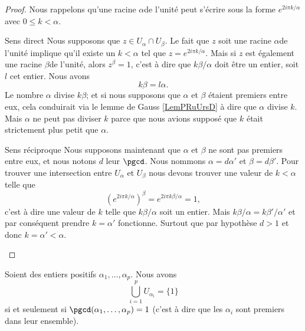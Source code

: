 \begin{proof}
    Nous rappelons qu'une racine \( \alpha\)\ieme de l'unité peut s'écrire sous la forme \(  e^{2i\pi k/\alpha}\) avec \( 0\leq k<\alpha\).
    \begin{subproof}
    \item[Sens direct]
        Nous supposons que \( z\in U_{\alpha}\cap U_{\beta}\). Le fait que \( z\) soit une racine \( \alpha\)\ieme de l'unité implique qu'il existe un \( k<\alpha\) tel que \( z= e^{2i\pi k/\alpha}\). Mais si \( z\) est également une racine \( \beta\)\ieme de l'unité, alors \( z^{\beta}=1\), c'est à dire que \( k\beta/\alpha\) doit être un entier, soit \( l\) cet entier. Nous avons
        \begin{equation}
            k\beta=l\alpha.
        \end{equation}
        Le nombre \( \alpha\) divise \( k\beta\); et si nous supposons que \( \alpha\) et \( \beta \) étaient premiers entre eux, cela conduirait via le lemme de Gauss \ref{LemPRuUrsD} à dire que \( \alpha\) divise \( k\). Mais \( \alpha\) ne peut pas diviser \( k\) parce que nous avions supposé que \( k\) était strictement plus petit que \( \alpha\).
    \item[Sens réciproque]
        Nous supposons maintenant que \( \alpha\) et \( \beta\) ne sont pas premiers entre eux, et nous notons \( d\) leur \( \pgcd\). Nous nommons \( \alpha=d\alpha'\) et \( \beta=d\beta'\). Pour trouver une intersection entre \( U_{\alpha}\) et \( U_{\beta}\) nous devons trouver une valeur de \( k<\alpha\) telle que
        \begin{equation}
            ( e^{2i\pi k/\alpha})^{\beta}= e^{2i\pi k\beta/\alpha}=1,
        \end{equation}
        c'est à dire une valeur de \( k\) telle que \( k\beta/\alpha\) soit un entier. Mais \( k\beta/\alpha=k\beta'/\alpha'\) et par conséquent prendre \( k=\alpha'\) fonctionne. Surtout que par hypothèse \( d>1\) et donc \( k=\alpha'<\alpha\).
    \end{subproof}
\end{proof}

\begin{proposition}  \label{PropFDDHooEyYxBC}
    Soient des entiers positifs \( \alpha_1,\ldots, \alpha_p\). Nous avons
    \begin{equation}
        \bigcup_{i=1}^pU_{\alpha_i}=\{ 1 \}
    \end{equation}
    si et seulement si \( \pgcd(\alpha_1,\ldots, \alpha_p)=1\) (c'est à dire que les \( \alpha_i\) sont premiers dans leur ensemble).
\end{proposition}

